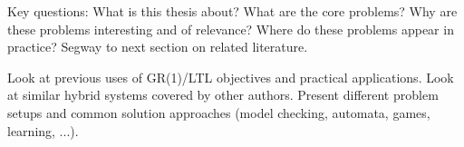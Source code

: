 Key questions:
What is this thesis about?
What are the core problems?
Why are these problems interesting and of relevance?
Where do these problems appear in practice?
Segway to next section on related literature.

Look at previous uses of GR(1)/LTL objectives and practical applications.
Look at similar hybrid systems covered by other authors.
Present different problem setups and common solution approaches (model checking, automata, games, learning, ...).

